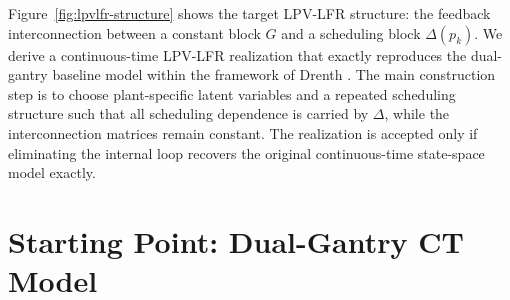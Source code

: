 \documentclass[11pt]{article}
\begin{document}
Figure~\ref{fig:lpvlfr-structure} shows the target LPV-LFR structure: the feedback interconnection between a constant block $G$ and a scheduling block $\Delta(p_k)$. We derive a continuous-time LPV-LFR realization that exactly reproduces the
dual-gantry baseline model within the framework of Drenth
\cite{drenth2025thesis}. The main construction step is to choose plant-specific latent variables and a repeated scheduling structure such that all scheduling dependence is carried by $\Delta$, while the interconnection matrices remain constant. The realization is accepted only if eliminating the internal loop recovers the
original continuous-time state-space model exactly.


\section{Starting Point: Dual-Gantry CT Model}
\end{document}
